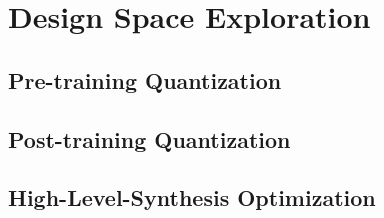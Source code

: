 \chapter{Design Space Exploration}\label{quantization}
\indo{}

\section{Pre-training Quantization}


\section{Post-training Quantization}


\section{High-Level-Synthesis Optimization}
